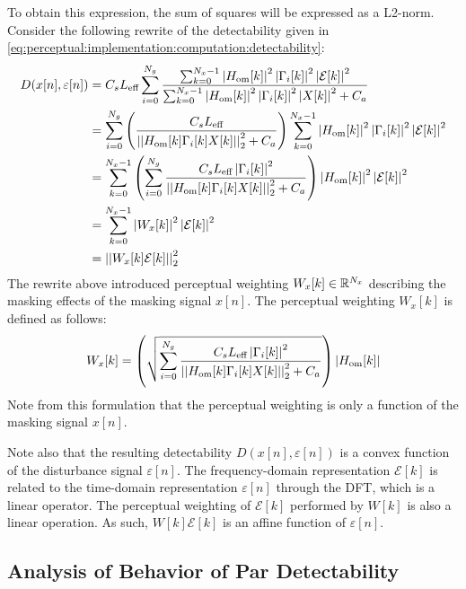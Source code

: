 To obtain this expression, the sum of squares will be expressed as a L2-norm.
Consider the following rewrite of the detectability given in \autoref{eq:perceptual:implementation:computation:detectability}: 
\begin{align*}
    D(x[n],\varepsilon[n]) &= C_s L_\text{eff}\sum_{i=0}^{N_g}
                        \frac{\sum_{k=0}^{N_x-1}\left|H_\text{om}[k]\right|^2\left|
                            \Gamma_i[k]\right|^2\left|\mathcal{E}[k]\right|^2}
                        {\sum_{k=0}^{N_x-1}\left|H_\text{om}[k]\right|^2\left|
                            \Gamma_i[k]\right|^2\left|X[k]\right|^2 + C_a} \\
                           &= \sum_{i=0}^{N_g}
                           \left(\frac{C_s L_\text{eff}}{\norm[2][2]{H_\text{om}[k]\Gamma_i[k]X[k]} + C_a}\right)
                        \sum_{k=0}^{N_x-1}\left|H_\text{om}[k]\right|^2\left|
                        \Gamma_i[k]\right|^2\left|\mathcal{E}[k]\right|^2 \\
                           &= \sum_{k=0}^{N_x-1}\left(\sum_{i=0}^{N_g}\frac{C_s L_\text{eff}\left|\Gamma_i[k]\right|^2}{\norm[2][2]{H_\text{om}[k]\Gamma_i[k]X[k]} + C_a}\right)
                        \left|H_\text{om}[k]\right|^2\left|\mathcal{E}[k]\right|^2 \\
                           &= \sum_{k=0}^{N_x-1}\left|W_x[k]\right|^2\left|\mathcal{E}[k]\right|^2 \\
                           &= \norm[2][2]{W_x[k]\mathcal{E}[k]} 
\end{align*}
The rewrite above introduced perceptual weighting $W_x[k]\in\mathbb{R}^{N_x}$ describing the masking effects of the masking signal $x[n]$. 
The perceptual weighting $W_x[k]$ is defined as follows: 
\begin{equation}
    W_x[k] = \left(\sqrt{\sum_{i=0}^{N_g}\frac{C_s L_\text{eff}\left|\Gamma_i[k]\right|^2}{\norm[2][2]{H_\text{om}[k]\Gamma_i[k]X[k]} + C_a}}\right)
                        \left|H_\text{om}[k]\right|
\end{equation}
Note from this formulation that the perceptual weighting is only a function of the masking signal $x[n]$.

Note also that the resulting detectability $D(x[n],\varepsilon[n])$ is a convex function of the disturbance signal $\varepsilon[n]$. 
The frequency-domain representation $\mathcal{E}[k]$ is related to the time-domain representation $\varepsilon[n]$ through the DFT, which is a linear operator.
The perceptual weighting of $\mathcal{E}[k]$ performed by $W[k]$ is also a linear operation.
As such, $W[k]\mathcal{E}[k]$ is an affine function of $\varepsilon[n]$.

\subsection{Analysis of Behavior of Par Detectability}
